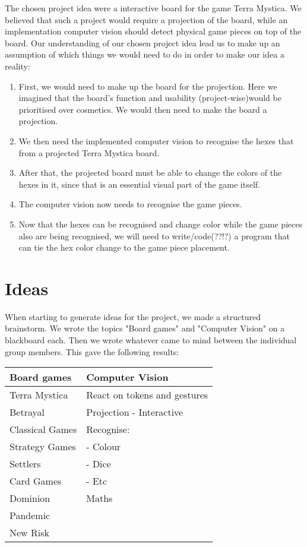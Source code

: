 The chosen project idea were a interactive board for the game Terra Mystica. We believed that such a project would require a projection of the board, while an implementation computer vision should detect physical game pieces on top of the board.
Our understanding of our chosen project idea lead us to make up an assumption of which things we would need to do in order to make our idea a reality:
\begin{enumerate}
\item First, we would need to make up the board for the projection. Here we imagined that the board's function and usability (project-wise)would be prioritised over cosmetics. We would then need to make the board a projection.
\item We then need the implemented computer vision to recognise the hexes that from a projected Terra Mystica board.
\item After that, the projected board must be able to change the colors of the hexes in it, since that is an essential visual part of the game itself.
\item The computer vision now needs to recognise the game pieces.
\item Now that the hexes can be recognised and change color while the game pieces also are being recognised, we will need to write/code(??!?) a program that can tie the hex color change to the game piece placement.
\end{enumerate}

\section{Ideas}\label{sec:idea}
When starting to generate ideas for the project, we made a structured brainstorm. We wrote the topics "Board games" and "Computer Vision" on a blackboard each. Then we wrote whatever came to mind between the individual group members. This gave the following results: 

\begin{tabular}{l | l}
Board games & Computer Vision\\
\hline
Terra Mystica & React on tokens and gestures\\
Betrayal & Projection - Interactive\\
Classical Games & Recognise:\\
Strategy Games & - Colour\\
Settlers & - Dice\\
Card Games & - Etc\\
Dominion & Maths\\
Pandemic & \\
New Risk & \\
\end{tabular}


